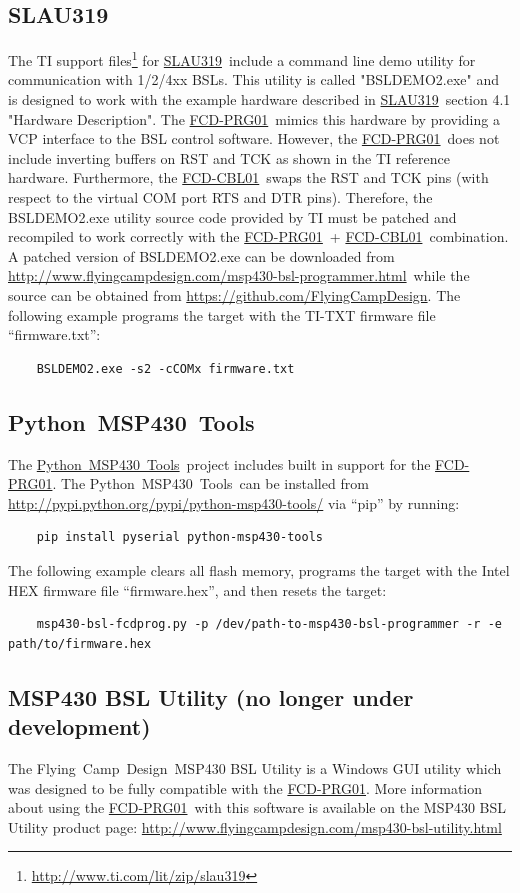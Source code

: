 \documentclass[10pt,letterpaper]{datasheet}
\newcommand{\PIDNOLINK}{FCD\nobreakdash-PRG01}
\newcommand{\PID}{\href{http://www.flyingcampdesign.com/msp430-bsl-programmer.html}{\PIDNOLINK}}
\newcommand{\PIDURL}{\href{http://www.flyingcampdesign.com/msp430-bsl-programmer.html}{http://www.flyingcampdesign.com/msp430-bsl-programmer.html}}
\newcommand{\PIDCBLNOLINK}{FCD-CBL01}
\newcommand{\PIDCBL}{\href{http://www.flyingcampdesign.com/msp430-bsl-programmer.html}{\PIDCBLNOLINK}}
\newcommand{\fcd}{Flying~Camp~Design}
\newcommand{\pmt}{Python~MSP430~Tools}
\newcommand{\pmturl}{\href{https://launchpad.net/python-msp430-tools/}{\pmt}}
\newcommand{\SLAUNOLINK}{SLAU319}
\newcommand{\SLAUPDF}{\href{http://www.ti.com/lit/pdf/SLAU319}{\SLAUNOLINK}}
\newcommand{\SLAUZIPURL}{\href{http://www.ti.com/lit/zip/slau319}{http://www.ti.com/lit/zip/slau319}}
\newcommand{\githuburl}{\href{http://github.com/FlyingCampDesign}{https://github.com/FlyingCampDesign}}
\newcommand{\fcdbslutility}{\href{http://www.flyingcampdesign.com/msp430-bsl-utility.html}{http://www.flyingcampdesign.com/msp430-bsl-utility.html}}
\begin{document}
\subsection*{\SLAUNOLINK}
The TI support files\footnote{\SLAUZIPURL} for \SLAUPDF\ include a command line demo utility for communication with 1/2/4xx BSLs.  This utility is called "BSLDEMO2.exe" and is designed to work with the example hardware described in \SLAUPDF\ section 4.1 "Hardware Description".  The \PID\ mimics this hardware by providing a VCP interface to the BSL control software.  However, the \PID\ does not include inverting buffers on RST and TCK as shown in the TI reference hardware.  Furthermore, the \PIDCBL\ swaps the RST and TCK pins (with respect to the virtual COM port RTS and DTR pins).  Therefore, the BSLDEMO2.exe utility source code provided by TI must be patched and recompiled to work correctly with the \PID\ + \PIDCBL\ combination.  A patched version of BSLDEMO2.exe can be downloaded from \PIDURL\ while the source can be obtained from \githuburl.  The following example programs the target with the TI-TXT firmware file ``firmware.txt'':
\begin{verbatim}
    BSLDEMO2.exe -s2 -cCOMx firmware.txt
\end{verbatim}

\subsection*{\pmt}
The \pmturl\ project includes built in support for the \PID.
The \pmt\ can be installed from \href{http://pypi.python.org/pypi/python-msp430-tools/}{http://pypi.python.org/pypi/python-msp430-tools/} via ``pip'' by running:
\begin{verbatim}
    pip install pyserial python-msp430-tools
\end{verbatim}
The following example clears all flash memory, programs the target with the Intel HEX firmware file ``firmware.hex'', and then resets the target:
\begin{verbatim}
    msp430-bsl-fcdprog.py -p /dev/path-to-msp430-bsl-programmer -r -e path/to/firmware.hex
\end{verbatim}

\subsection*{MSP430 BSL Utility (no longer under development)}
The \fcd\ MSP430 BSL Utility is a Windows GUI utility which was designed to be fully compatible with the \PID. More information about using the \PID\ with this software is available on the MSP430 BSL Utility product page: \newline
\fcdbslutility
\end{document}
